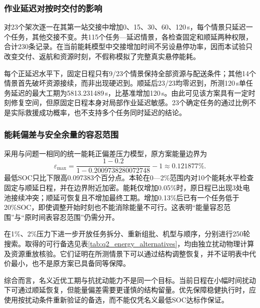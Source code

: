 \subsubsection{作业延迟对按时交付的影响}
对23个架次逐一在其第一站交接中增加0、15、30、60、120\,s，每个情景只延迟一个任务，其他交接不变。共115个任务—延迟情景，各检查固定和顺延两种权限，合计230条记录。在当前能耗模型中交接增加时间不另设悬停功率，因而本试验只改变交付、返航和资源时刻，不假称模拟了完整真实悬停能耗。

每个正延迟水平下，固定日程只有9/23个情景保持全部资源与配送条件；其他14个情景首先破坏资源接续，而非出现硬迟到。顺延后23/23均零迟到，所测120\,s单任务延迟的最大工期为5813.231489\,s，比基准增加120\,s。由此可见该方案具有一定时刻修复空间，但原固定日程本身对局部作业延迟敏感。23个确定任务的通过比例不是实际救援成功概率，也不支持多个任务同时延迟的结论。

\subsubsection{能耗偏差与安全余量的容忍范围}
采用与问题一相同的统一能耗正偏差压力模型，原方案能量边界为
\begin{equation}
 \varepsilon_{\max}=\frac{1-0.2}{1-0.2009738280072748}-1\approx0.121877\%.
\label{eq:q2_energy_limit}
\end{equation}
最低SOC只比下限高0.097383个百分点。本轮在0—2\%范围内对10个能耗水平检查固定与顺延日程，并在边界附近加密。能耗仅增加0.05\%时，原日程已出现3处电池接续冲突；顺延可恢复且不增加最终工期。增加0.13\%后已有一个任务低于20\%SOC，即使调整开始时刻也不能消除能量不可行。这表明“能量容忍范围”与“原时间表容忍范围”仍需分开。

在1\%、2\%压力下进一步开放任务拆分、重新组批、机型与顺序，分别进行250轮搜索。取得的可行备选见表\ref{tab:q2_energy_alternatives}，均由独立扰动物理计算及资源重放核验。它们证明在所测情景下可以通过结构调整恢复，并不证明表中代价最小，也不是原方案已具备同等保障。


综合而言，名义近优工期与抗扰动能力不是同一个目标。当前日程在小幅时间扰动下可通过顺延恢复，但能量偏差需要更谨慎的结构留量。优先保障稳健执行时，应使用按扰动条件重新验证的备选，而不能仅凭名义最低SOC达标作保证。


